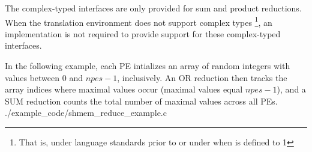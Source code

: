 \begin{apidefinition}
{    The complex-typed interfaces are only provided for sum and product reductions.
    When the \Cstd translation environment does not support complex types
    \footnote{That is, under \Cstd language standards prior to \Cstd[99] or under \Cstd[11]
    when  is defined to 1}, an \openshmem
    implementation is not required to provide support for these
    complex-typed interfaces.
}


\begin{apiexamples}

\apicexample
    {In the following \Cstd[11] example, each \ac{PE} intializes an array of
    random integers with values between $0$ and $npes-1$, inclusively.  An OR
    reduction then tracks the array indices where maximal values occur (maximal
    values equal $npes - 1$), and a SUM reduction counts the total number of
    maximal values across all PEs.
    }
    {./example_code/shmem_reduce_example.c}
    {}

\end{apiexamples}

\end{apidefinition}
